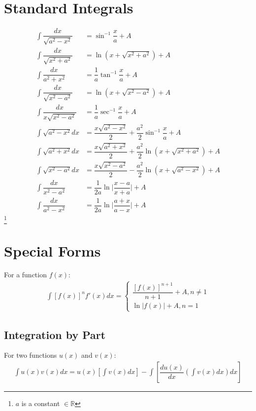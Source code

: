 \documentclass[../main.tex]{subfile}
\begin{document}
\section{Standard Integrals}
\begin{align}
    \int \dfrac{dx}{\sqrt{a^2 - x^2}} & = \sin^{-1} \dfrac{x}{a} + A\\
    \int \dfrac{dx}{\sqrt{x^2 + a^2}} & = \ln (x + \sqrt{x^2 + a^2}) + A\\
    \int \dfrac{dx}{a^2 + x^2} & = \dfrac{1}{a} \tan^{-1} \dfrac{x}{a} + A\\
    \int \dfrac{dx}{\sqrt{x^2 - a^2}} & = \ln (x + \sqrt{x^2-a^2}) + A\\
    \int \dfrac{dx}{x \sqrt{x^2 - a^2}} & = \dfrac{1}{a} \sec^{-1} \dfrac{x}{a} + A\\
    \int \sqrt{a^2 - x^2} dx & = \dfrac{x\sqrt{a^2 - x^2}}{2} + \dfrac{a^2}{2} \sin^{-1} \dfrac{x}{a} + A\\
    \int \sqrt{a^2 + x^2} dx & = \dfrac{x\sqrt{a^2 + x^2}}{2} + \dfrac{a^2}{2} \ln (x + \sqrt{x^2 + a^2}) + A\\
    \int \sqrt{x^2 - a^2} dx & = \dfrac{x\sqrt{x^2 - a^2}}{2} - \dfrac{a^2}{2} \ln (x + \sqrt{a^2 - x^2}) + A\\
    \int \dfrac{dx}{x^2 - a^2} & = \dfrac{1}{2a} \ln \lvert \dfrac{x - a}{x + a} \rvert + A\\
    \int \dfrac{dx}{a^2 - x^2} & = \dfrac{1}{2a} \ln \lvert \dfrac{a + x}{a - x} \rvert + A
\end{align}
\footnote{$a$ is a constant $\in\mathbb{R}$}

\section{Special Forms}
For a function $f(x)$:
\begin{align}
\int [f(x)]^n f'(x) dx =
    \begin{cases}
        \dfrac{[f(x)]^{n + 1}}{n + 1} + A, n \neq 1\\
        \ln \lvert f(x) \rvert + A, n=1
    \end{cases}
\end{align}
\subsection{Integration by Part}
For two functions $u(x)$ and $v(x)$:
\begin{align}
    \int u(x) v(x) dx = u(x) \left[ \int v(x) dx \right] - \int \left[ \dfrac{du(x)}{dx} \left( \int v(x) dx \right) dx \right]
\end{align}
\end{document}
